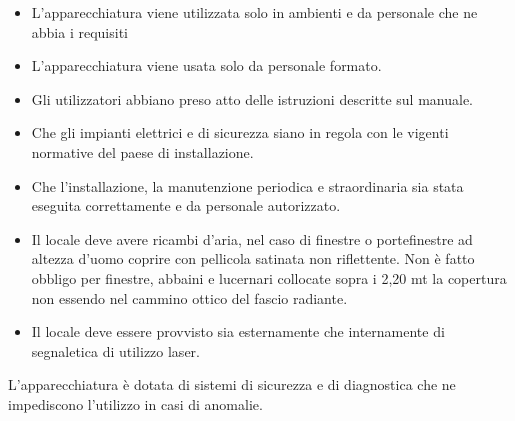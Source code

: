 \documentclass[10pt]{article}
\begin{document}
\begin{itemize}
  \item L'apparecchiatura viene utilizzata solo in ambienti e da personale che ne abbia i requisiti
  \item L'apparecchiatura viene usata solo da personale formato.
  \item Gli utilizzatori abbiano preso atto delle istruzioni descritte sul manuale.
  \item Che gli impianti elettrici e di sicurezza siano in regola con le vigenti normative del paese di installazione.
  \item Che l'installazione, la manutenzione periodica e straordinaria sia stata eseguita correttamente e da personale autorizzato.
  \item Il locale deve avere ricambi d'aria, nel caso di finestre o portefinestre ad altezza d'uomo coprire con pellicola satinata non riflettente. Non è fatto obbligo per finestre, abbaini e lucernari collocate sopra i 2,20 mt la copertura non essendo nel cammino ottico del fascio radiante.
  \item Il locale deve essere provvisto sia esternamente che internamente di segnaletica di utilizzo laser.
\end{itemize}

L'apparecchiatura è dotata di sistemi di sicurezza e di diagnostica che ne impediscono l'utilizzo in casi di anomalie.
\end{document}
